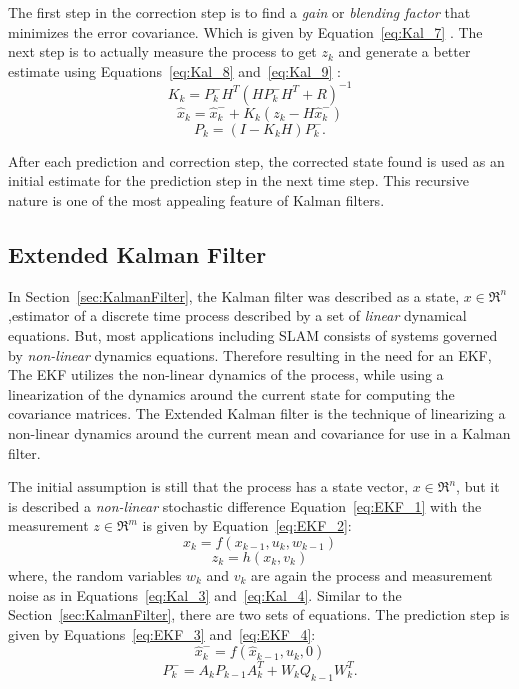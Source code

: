 The first step in the correction step is to find a \textit{gain} or \textit{blending factor} that minimizes the error covariance. Which is given by Equation~\ref{eq:Kal_7} \cite{Kalman1960,Maybeck1979,Jacobs1993,Brown2012}. 
The next step is to actually measure the process to get $ z_k $ and generate a better estimate using Equations~\ref{eq:Kal_8} and~\ref{eq:Kal_9} \cite{WelchandBishop1995}:
\begin{equation}
\label{eq:Kal_7}
K_k = P^-_kH^T(HP^-_kH^T+R)^{-1}
\end{equation}
\begin{equation}
\label{eq:Kal_8}
\hat{x}_k = \hat{x}^-_k+K_k(z_k-H\hat{x}^-_k)
\end{equation}
\begin{equation}
\label{eq:Kal_9}
P_k = (I-K_kH)P^-_k.
\end{equation} 

After each prediction and correction step, the corrected state found is used as an initial estimate for the prediction step in the next time step. This recursive nature is one of the most appealing feature of Kalman filters. 

\subsection{Extended Kalman Filter}
\label{sec:EKF}

 In Section~\ref{sec:KalmanFilter}, the Kalman filter was described as a state, $ x \in \Re^n $,estimator of a discrete time process described by a set of \textit{linear} dynamical equations. But, most applications including SLAM consists of systems governed by \textit{non-linear} dynamics equations. Therefore resulting in the need for an EKF, The EKF utilizes the non-linear dynamics of the process, while using a linearization of the dynamics around the current state for computing the covariance matrices.  The Extended Kalman filter is the technique of linearizing a non-linear dynamics around the current mean and covariance for use in a Kalman filter.
 
 The initial assumption is still that the process has a state vector, $ x \in \Re^n $, but it is described a \textit{non-linear} stochastic difference Equation~\ref{eq:EKF_1} with the measurement $ z \in \Re^m $ is given by Equation~\ref{eq:EKF_2}:
 \begin{equation}
 \label{eq:EKF_1}
 x_k = f(x_{k-1},u_k,w_{k-1})
 \end{equation}
 \begin{equation}
 \label{eq:EKF_2}
 z_k = h(x_k,v_k)
 \end{equation}
where, the random variables $ w_k$  and  $v_k $ are again the process and measurement noise as in Equations~\ref{eq:Kal_3} and~\ref{eq:Kal_4}. Similar to the Section~\ref{sec:KalmanFilter}, there are two sets of equations. The prediction step is given by Equations~\ref{eq:EKF_3} and~\ref{eq:EKF_4}:
\begin{equation}
 \label{eq:EKF_3}
 \hat{x}^-_k = f(\hat{x}_{k-1},u_k,0)
\end{equation}
\begin{equation}
 \label{eq:EKF_4}
 P^-_k = A_kP_{k-1}A_k^T + W_kQ_{k-1}W^T_k.
\end{equation}

